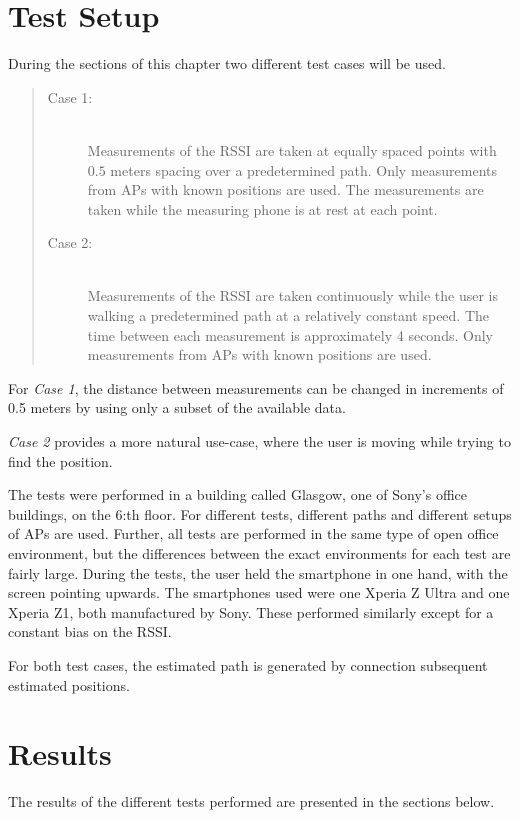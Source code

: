 \documentclass{LTHthesis}
\begin{document}
%
\section{Test Setup}
\label{sec:test_setup}
%
During the sections of this chapter two different test cases will be used.
\begin{quote}
%
\begin{description}
%
\item[Case 1:] \hfill \\
%
Measurements of the RSSI are taken at equally spaced points with $0.5$ meters spacing over a predetermined path. Only measurements from APs with known positions are used. The measurements are taken while the measuring phone is at rest at each point.  
%
\vspace{5pt}
%
\item[Case 2:] \hfill \\
%
Measurements of the RSSI are taken continuously while the user is walking a predetermined path at a relatively constant speed. The time between each measurement is approximately 4 seconds. Only measurements from APs with known positions are used.  
%
\end{description}

\end{quote}
%
For \emph{Case 1}, the distance between measurements can be changed in increments of 0.5 meters by using only a subset of the available data. 

\emph{Case 2} provides a more natural use-case, where the user is moving while trying to find the position.

The tests were performed in a building called Glasgow, one of Sony's office buildings, on the 6:th floor. For different tests, different paths and different setups of APs are used. Further, all tests are performed in the same type of open office environment, but the differences between the exact environments for each test are fairly large. During the tests, the user held the smartphone in one hand, with the screen pointing upwards. The smartphones used were one Xperia Z Ultra and one Xperia Z1, both manufactured by Sony. These performed similarly except for a constant bias on the RSSI.

For both test cases, the estimated path is generated by connection subsequent estimated positions. 
%
\section{Results}
\label{environment_results}
%
The results of the different tests performed are presented in the sections below. 
%
\end{document}
